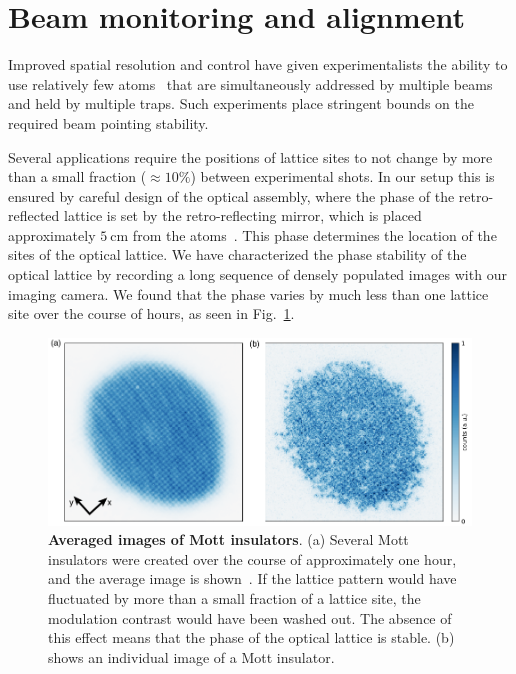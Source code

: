 \documentclass[twocolumn,aps,pra,showpacs,preprintnumbers,bibnotes]{revtex4-1}
\newcommand\unit[2]{\ensuremath{#1~\mathrm{{#2}}}}
\begin{document}
\section{Beam monitoring and alignment}
Improved spatial resolution and control have given experimentalists the ability to use relatively few atoms~\cite{Preiss2015, Choi2016, Mazurenko2017} that are simultaneously addressed by multiple beams and held by multiple traps.
Such experiments place stringent bounds on the required beam pointing stability.

Several applications require the positions of lattice sites to not change by more than a small fraction ($\approx 10\%$) between experimental shots.
In our setup this is ensured by careful design of the optical assembly, where the phase of the retro-reflected lattice is set by the retro-reflecting mirror, which is placed approximately \unit{5}{cm} from the atoms~\cite{Huber2014}.
This phase determines the location of the sites of the optical lattice.
We have characterized the phase stability of the optical lattice by recording a long sequence of densely populated images with our imaging camera. We found that the phase varies by much less than one lattice site over the course of hours, as seen in Fig.~\ref{fig:averaged_mott}.

\begin{figure}
  \begin{center}
    \includegraphics{Figure12.pdf}
    \caption{\textbf{Averaged images of Mott insulators}. (a) Several Mott insulators were created over the course of approximately one hour, and the average image is shown~\cite{Greif2016}. If the lattice pattern would have fluctuated by more than a small fraction of a lattice site, the modulation contrast would have been washed out. The absence of this effect means that the phase of the optical lattice is stable. (b) shows an individual image of a Mott insulator.}\label{fig:averaged_mott}
  \end{center}
\end{figure}
\end{document}
